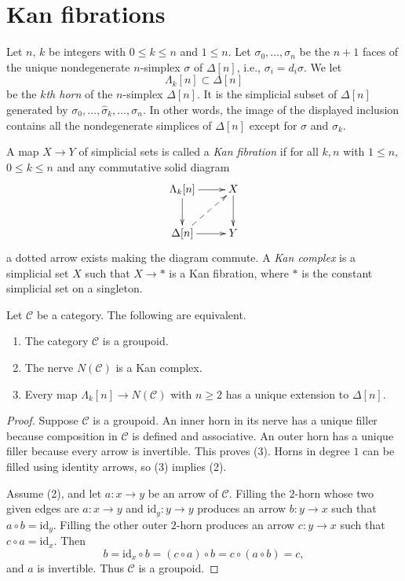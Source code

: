 \section{Kan fibrations}
\label{section-kan}

\noindent
Let $n$, $k$ be integers with $0 \leq k \leq n$ and $1 \leq n$.
Let $\sigma_0, \ldots, \sigma_n$
be the $n + 1$ faces of the unique nondegenerate $n$-simplex $\sigma$
of $\Delta[n]$, i.e., $\sigma_i = d_i\sigma$. We let
$$
\Lambda_k[n] \subset \Delta[n]
$$
be the {\it $k$th horn} of the $n$-simplex $\Delta[n]$. It is the
simplicial subset of $\Delta[n]$ generated by
$\sigma_0, \ldots, \hat \sigma_k, \ldots, \sigma_n$. In other words,
the image of the displayed inclusion contains all the nondegenerate
simplices of $\Delta[n]$ except for $\sigma$ and $\sigma_k$.

\begin{definition}
\label{definition-kan}
A map $X \to Y$ of simplicial sets is called a {\it Kan fibration}
if for all $k, n$ with $1 \leq n$, $0 \leq k \leq n$ and any commutative
solid diagram
$$
\xymatrix{
\Lambda_k[n] \ar[r] \ar[d] & X \ar[d] \\
\Delta[n] \ar[r] \ar@{-->}[ru] & Y
}
$$
a dotted arrow exists making the diagram commute. A {\it Kan complex}
is a simplicial set $X$ such that $X \to *$ is a Kan fibration, where
$*$ is the constant simplicial set on a singleton.
\end{definition}

\begin{lemma}
\label{lemma-nerve-groupoid-kan}
Let $\mathcal{C}$ be a category. The following are equivalent.
\begin{enumerate}
\item The category $\mathcal{C}$ is a groupoid.
\item The nerve $N(\mathcal{C})$ is a Kan complex.
\item Every map
$\Lambda_k[n] \to N(\mathcal{C})$ with $n \geq 2$ has a unique extension
to $\Delta[n]$.
\end{enumerate}
\end{lemma}

\begin{proof}
Suppose $\mathcal{C}$ is a groupoid. An inner horn in its nerve has a unique
filler because composition in $\mathcal{C}$ is defined and associative. An
outer horn has a unique filler because every arrow is invertible. This proves
(3). Horns in degree $1$ can be filled using identity arrows, so (3) implies
(2).

Assume (2), and let $a : x \to y$ be an arrow of $\mathcal{C}$. Filling the
$2$-horn whose two given edges are $a : x \to y$ and
$\text{id}_y : y \to y$ produces an arrow $b : y \to x$ such that
$a \circ b = \text{id}_y$. Filling the other outer $2$-horn produces an arrow
$c : y \to x$ such that $c \circ a = \text{id}_x$. Then
$$
b = \text{id}_x \circ b = (c \circ a) \circ b
= c \circ (a \circ b) = c,
$$
and $a$ is invertible. Thus $\mathcal{C}$ is a groupoid.
\end{proof}

